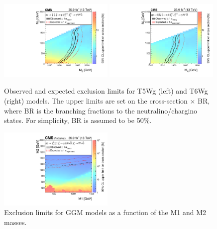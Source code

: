 \documentclass[thesis.tex]{subfiles}
\renewcommand\_{\textunderscore\allowbreak}
\begin{document}
\begin{figure}[tb]
  \centering
    \includegraphics[width=0.49\textwidth]{Fig/Figure_007-a.pdf}
    \includegraphics[width=0.49\textwidth]{Fig/Figure_007-b.pdf}
		\caption{Observed and expected exclusion limits for T5Wg (left) and T6Wg (right) models. The upper limits are set on the cross-section $\times$ BR, where BR is the branching fractions to the neutralino/chargino states. For simplicity, BR is assumed to be 50\%. }
    \label{fig:t5wglimit}
\end{figure}

\begin{figure}[tb]
  \centering
    \includegraphics[width=0.49\textwidth]{Fig/GGMXSEC.pdf}
    \caption{Exclusion limits for GGM models as a function of the M1 and M2 masses.}
     \label{fig:M1M2limit}
\end{figure}
\end{document}
